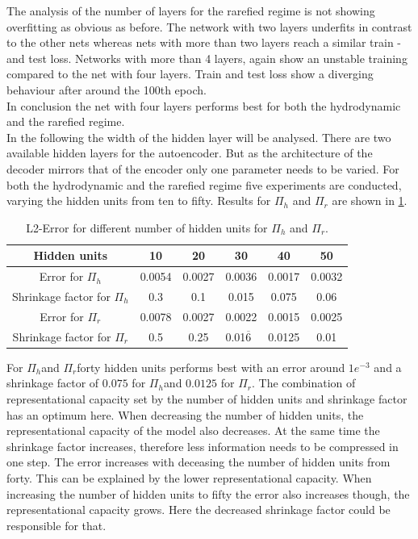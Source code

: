 \documentclass[12pt, a4paper]{article}
\newcommand{\hy}{\(\Pi_h\)}
\newcommand{\rare}{\(\Pi_r\)}
\begin{document}
The analysis of the number of layers for the rarefied regime is not showing overfitting as obvious as before. The network with two layers underfits in contrast to the other nets whereas nets with more than two layers reach a similar train - and test loss. Networks with more than 4 layers, again show an unstable training compared to the net with four layers. Train and test loss show a diverging behaviour after around the 100th epoch.\\
In conclusion the net with four layers performs best for both the hydrodynamic and the rarefied regime.\\
In the following the width of the hidden layer will be analysed. There are two available hidden layers for the autoencoder. But as the architecture of the decoder mirrors that of the encoder only one parameter needs to be varied. For both the hydrodynamic and the rarefied regime five experiments are conducted, varying the hidden units from ten to fifty. Results for \(\Pi_h\) and \(\Pi_r\) are shown in \cref{Tab:Hidden Units}.
\begin{table}[!htbp]\centering
	\begin{tabular}{ |c|c|c|c|c|c| }
		\hline
		Hidden units & 10 & 20 & 30  & 40 & 50 \\ [.5ex]
		\hline
		Error for \(\Pi_h\) & 0.0054 & 0.0027 & 0.0036 & 0.0017 & 0.0032\\ \hline
		Shrinkage factor for \hy & 0.3 & 0.1 & 0.015 & 0.075 & 0.06\\ \hline
		Error for \(\Pi_r\)& 0.0078 & 0.0027 & 0.0022 & 0.0015 & 0.0025\\ \hline
		Shrinkage factor for \rare & 0.5 & 0.25 & 0.01$\overline{6}$\ & 0.0125 & 0.01\\ \hline
	\end{tabular}
	\caption{L2-Error for different number of hidden units for \(\Pi_h\) and \(\Pi_r\).}
	\label{Tab:Hidden Units}
\end{table}
For \hy and \rare forty hidden units performs best with an error around \(1e^{-3}\) and a shrinkage factor of \(0.075\) for \hy and \(0.0125\) for \rare. The combination of representational capacity set by the number of hidden units and shrinkage factor has an optimum here.  When decreasing the number of hidden units, the representational capacity of the model also decreases. At the same time the shrinkage factor increases, therefore less information needs to be compressed in one step. The error increases with deceasing the number of hidden units from forty. This can be explained by the lower representational capacity. When increasing the number of hidden units to fifty the error also increases though, the representational capacity grows. Here the decreased shrinkage factor could be responsible for that.\\
\end{document}
